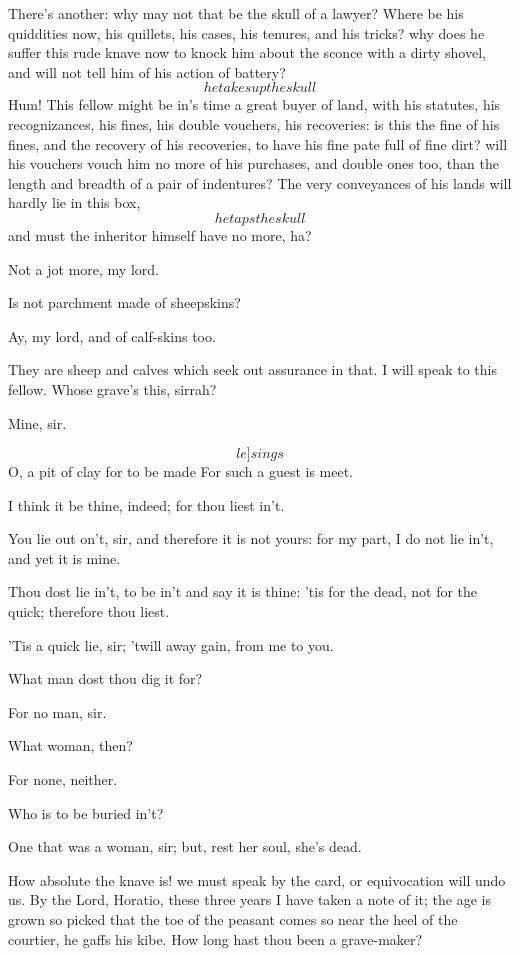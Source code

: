 \documentclass[11pt]{book}
\newenvironment {song}[1][0]
 {\Versus 
  \Locus \textus {+7em+#1em} 
  \Forma \strophae {01}
 }
 {\endVersus}
\begin{document}
\1	There's another: why may not that be the skull of a
	lawyer? Where be his quiddities now, his quillets,
	his cases, his ten\-ures, and his tricks? why does he
	suffer this rude knave now to knock him about the
	sconce with a dirty shovel, and will not tell him of
	his action of battery? \[he takes up the skull\] Hum!
   This fellow might be
	in's time a great buyer of land, with his statutes,
	his recognizances, his fines, his double vouchers,
	his recoveries: is this the fine of his fines, and
	the recovery of his recoveries, to have his fine
	pate full of fine dirt? will his vouchers vouch him
	no more of his purchases, and double ones too, than
	the length and breadth of a pair of indentures? The
	very conveyances of his lands will hardly lie in
	this box, \[he taps the skull\] and must the inheritor
   himself have no more, ha?

\6	Not a jot more, my lord.

\1	Is not parchment made of sheepskins?

\6	Ay, my lord, and of calf-skins too.

\1	They are sheep and calves which seek out assurance
	in that. I will speak to this fellow. Whose
	grave's this, sirrah?

	Mine, sir. 
\begin{song}[-3]
  \[le]sings\]	O, a pit of clay for to be made
	For such a guest is meet.
\end{song}

\1	I think it be thine, indeed; for thou liest in't.

	You lie out on't, sir, and therefore it is not
	yours: for my part, I do not lie in't, and yet it is mine.

\1	Thou dost lie in't, to be in't and say it is thine:
	'tis for the dead, not for the quick; therefore thou liest.

	'Tis a quick lie, sir; 'twill away gain, from me to
	you.

\1	What man dost thou dig it for?

	For no man, sir.

\1	What woman, then?

	For none, neither.

\1	Who is to be buried in't?

	One that was a woman, sir; but, rest her soul, she's dead.

\1	How absolute the knave is! we must speak by the
	card, or equivocation will undo us. By the Lord,
	Horatio, these three years I have taken a note of
	it; the age is grown so picked that the toe of the
	peasant comes so near the heel of the courtier, he
	gaffs his kibe. How long hast thou been a
	grave-maker?
\end{document}
